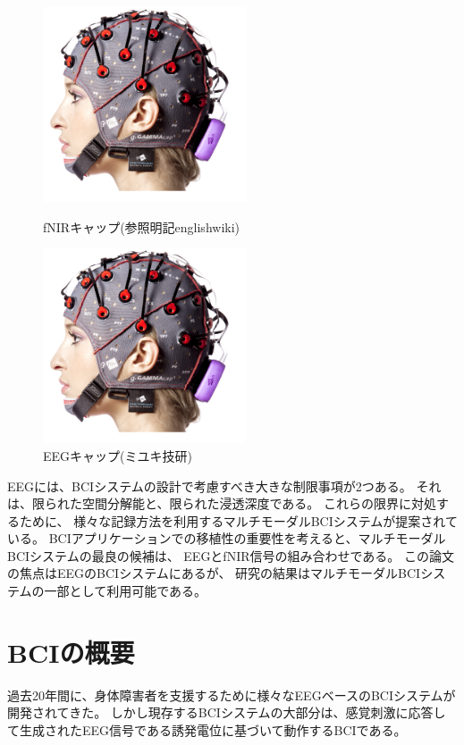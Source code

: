 \begin{figure}[t]
    \begin{minipage}{0.5\hsize}
        \begin{center}
            \includegraphics[width=60mm]{images/eeg.png}
        \end{center}
        \caption{fNIRキャップ(参照明記englishwiki)}
        \label{fig:fNIR}
    \end{minipage}
    \begin{minipage}{0.5\hsize}
        \begin{center}
            \includegraphics[width=60mm]{images/eeg.png}
        \end{center}
        \caption{EEGキャップ(ミユキ技研)}
        \label{fig:EEG}
    \end{minipage}
\end{figure}

EEGには、BCIシステムの設計で考慮すべき大きな制限事項が2つある。
それは、限られた空間分解能と、限られた浸透深度である。
これらの限界に対処するために、
様々な記録方法を利用するマルチモーダルBCIシステムが提案されている\cite{京大ドクター}。
BCIアプリケーションでの移植性の重要性を考えると、マルチモーダルBCIシステムの最良の候補は、
EEGとfNIR信号の組み合わせである。
この論文の焦点はEEGのBCIシステムにあるが、
研究の結果はマルチモーダルBCIシステムの一部として利用可能である。

\section{{\rm BCI}{\mc の概要}}
過去20年間に、身体障害者を支援するために様々なEEGベースのBCIシステムが開発されてきた。
しかし現存するBCIシステムの大部分は、感覚刺激に応答して生成されたEEG信号である誘発電位に基づいて動作するBCIである。
